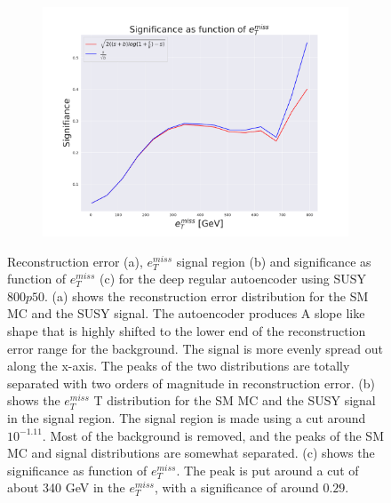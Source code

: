 \begin{figure}[H]
    \begin{subfigure}{.40\textwidth}
        \includegraphics[width=\textwidth]{Figures/AE_testing/big/2lep/significance_etmiss_800p0p050_-1.1125283423037047.pdf}
        \caption{}
        \label{fig:AE_2lep_big_signi_800_2}
    \end{subfigure}
    \hfill      
    \caption[2lep deep network | $800p50$ | AE | 2]{Reconstruction error (a), $e_T^{miss}$ signal region (b) and significance as function of 
    $e_T^{miss}$ (c) for the deep regular autoencoder using SUSY $800p50$. 
    (a) shows the reconstruction error distribution for the SM MC and the SUSY signal. 
    The autoencoder produces A slope like shape that is highly shifted to the lower end of the reconstruction error range
for the background. The signal is more evenly spread out along the x-axis. The peaks of the two distributions are totally separated
with two orders of magnitude in reconstruction error. (b) shows the $e_T^{miss}$
T distribution for the SM MC and the SUSY signal in the signal region. The signal region is made using a cut around
$10^{-1.11}$. Most of the background is removed, and the peaks of the SM MC and signal distributions are
somewhat separated. (c) shows the significance as function of $e_T^{miss}$. The peak is put 
around a cut of about 340 GeV in the $e_T^{miss}$, with a significance of around $0.29$.}
    \label{fig:AE_2lep_big_rec_sig_signi_800_2}
\end{figure}

